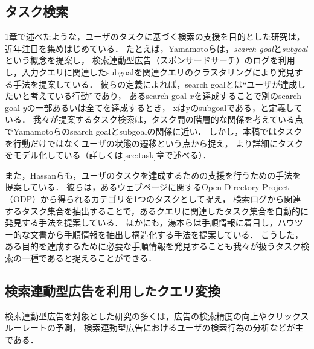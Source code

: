 \documentclass[submit,techreq]{ipsj}
\begin{document}
\subsection{タスク検索}
1章で述べたような，ユーザのタスクに基づく検索の支援を目的とした研究は，近年注目を集めはじめている．
たとえば，Yamamotoらは，\textit{search goal}と\textit{subgoal}という概念を提案し，
検索連動型広告（スポンサードサーチ）のログを利用し，入力クエリに関連したsubgoalを関連クエリのクラスタリングにより発見する手法を提案している\cite{yamamoto2012wisdom}．
彼らの定義によれば，search goalとは``ユーザが達成したいと考えている行動''であり，
あるsearch goal $x$を達成することで別のsearch goal $y$の一部あるいは全てを達成するとき，
xはyのsubgoalである，と定義している．
我々が提案するタスク検索は，タスク間の階層的な関係を考えている点でYamamotoらのsearch goalとsubgoalの関係に近い．
しかし，本稿ではタスクを行動だけではなくユーザの状態の遷移という点から捉え，
より詳細にタスクをモデル化している（詳しくは\ref{sec:task}章で述べる）．

また，Hassanらも，ユーザのタスクを達成するための支援を行うための手法を提案している\cite{hassan2012task}．
彼らは，あるウェブページに関するOpen Directory Project（ODP）から得られるカテゴリを1つのタスクとして捉え，
検索ログから関連するタスク集合を抽出することで，あるクエリに関連したタスク集合を自動的に発見する手法を提案している．
ほかにも，湯本らは手順情報に着目し，ハウツー的な文書から手順情報を抽出し構造化する手法を提案している\cite{yumotoHowTo}．
こうした，ある目的を達成するために必要な手順情報を発見することも我々が扱うタスク検索の一種であると捉えることができる．


\subsection{検索連動型広告を利用したクエリ変換}
\label{sec:tamugi}
検索連動型広告を対象とした研究の多くは，広告の検索精度の向上\cite{BroderAdQueryExpansion}やクリックスルーレートの予測\cite{RichardsonEstimatingCTR}，
検索連動型広告におけるユーザの検索行為の分析\cite{jansen2005examining}\cite{DanescuNiculescuMizilInterplayAd}などが主である．
\end{document}

